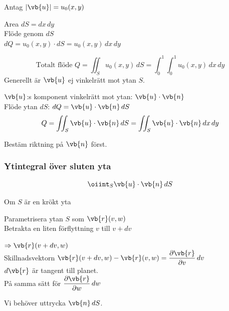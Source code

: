 Antag $|\vb{u}| = u_0(x, y)$

\begin{minipage}{0.45\linewidth}
\end{minipage}
\begin{minipage}{0.53\linewidth}
Area $dS = dx\,dy$\\
Flöde genom $dS$\\
$dQ = u_0(x, y) \cdot dS = u_0(x, y)\,dx\,dy$
\end{minipage}
\[ \text{Totalt flöde } Q = \iint_S u_0(x, y)\,dS = \int_0^1\!\!\int_0^1 u_0(x, y)\,dx\,dy \]
Generellt är $\vb{u}$ ej vinkelrätt mot ytan $S$.

\begin{minipage}{0.36\linewidth}
\end{minipage}
\begin{minipage}{0.62\linewidth}
$\vb{u}$:s komponent vinkelrätt mot ytan: $\vb{u} \cdot \vb{n}$\\
Flöde ytan $dS$: $dQ = \vb{u} \cdot \vb{n}\,dS$
\[ Q = \iint_S \vb{u} \cdot \vb{n}\,dS = \iint_S \vb{u} \cdot \vb{n}\,dx\,dy \]
\end{minipage}

Bestäm riktning på $\vb{n}$ först.

\subsubsection*{Ytintegral över sluten yta}
\begin{minipage}{0.3\linewidth}
\end{minipage}
\begin{minipage}{0.68\linewidth}
\[ \oiint_S \vb{u} \cdot \vb{n}\,dS \]
\end{minipage}

\begin{center}Om $S$ är en krökt yta\end{center}

\begin{minipage}{0.38\linewidth}
\end{minipage}
\begin{minipage}{0.6\linewidth}
Parametrisera ytan $S$ som $\vb{r}(v, w)$\\
Betrakta en liten förflyttning $v$ till $v + dv$
\end{minipage}

$\Rightarrow \vb{r}(v + dv, w)$\\
Skillnadsvektorn $\vb{r}(v + dv, w) - \vb{r}(v, w) = \dfrac{\partial\vb{r}}{\partial v}\,dv$\\
$d\vb{r}$ är tangent till planet.\\
På samma sätt för $\dfrac{\partial\vb{r}}{\partial w}\,dw$

Vi behöver uttrycka $\vb{n}\,dS$.
